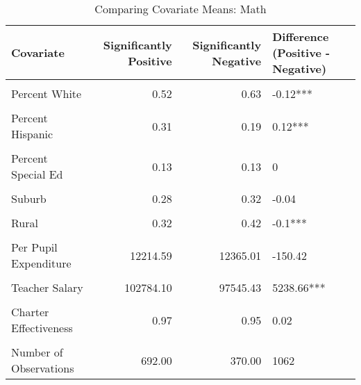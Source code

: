 \begin{table}[!h]
\centering
\caption{\label{tab:cov_means_math}Comparing Covariate Means: Math}
\centering
\begin{tabular}[t]{lrrl}
\toprule
Covariate & Significantly 
 Positive & Significantly 
 Negative & Difference 
 (Positive - Negative)\\
\midrule
\cellcolor{gray!10}{Log of Enrollment} & \cellcolor{gray!10}{8.01} & \cellcolor{gray!10}{8.03} & \cellcolor{gray!10}{-0.02}\\
Percent White & 0.52 & 0.63 & -0.12***\\
\cellcolor{gray!10}{Percent Black} & \cellcolor{gray!10}{0.06} & \cellcolor{gray!10}{0.13} & \cellcolor{gray!10}{-0.07***}\\
Percent Hispanic & 0.31 & 0.19 & 0.12***\\
\cellcolor{gray!10}{Percent Free/Reduced Lunch} & \cellcolor{gray!10}{0.55} & \cellcolor{gray!10}{0.54} & \cellcolor{gray!10}{0.01}\\
Percent Special Ed & 0.13 & 0.13 & 0\\
\cellcolor{gray!10}{Urban} & \cellcolor{gray!10}{0.16} & \cellcolor{gray!10}{0.09} & \cellcolor{gray!10}{0.08***}\\
Suburb & 0.28 & 0.32 & -0.04\\
\cellcolor{gray!10}{Town} & \cellcolor{gray!10}{0.24} & \cellcolor{gray!10}{0.18} & \cellcolor{gray!10}{0.06**}\\
Rural & 0.32 & 0.42 & -0.1***\\
\cellcolor{gray!10}{Per Pupil Revenue} & \cellcolor{gray!10}{12457.53} & \cellcolor{gray!10}{12154.63} & \cellcolor{gray!10}{302.9}\\
Per Pupil Expenditure & 12214.59 & 12365.01 & -150.42\\
\cellcolor{gray!10}{Student-Teacher Ratio} & \cellcolor{gray!10}{18.24} & \cellcolor{gray!10}{17.11} & \cellcolor{gray!10}{1.13***}\\
Teacher Salary & 102784.10 & 97545.43 & 5238.66***\\
\cellcolor{gray!10}{Number of Magnet Schools} & \cellcolor{gray!10}{0.04} & \cellcolor{gray!10}{0.77} & \cellcolor{gray!10}{-0.73***}\\
Charter Effectiveness & 0.97 & 0.95 & 0.02\\
\cellcolor{gray!10}{Baseline Performance} & \cellcolor{gray!10}{-0.24} & \cellcolor{gray!10}{-0.20} & \cellcolor{gray!10}{-0.04}\\
\midrule
Number of Observations & 692.00 & 370.00 & 1062\\
\bottomrule
\end{tabular}
\end{table}

